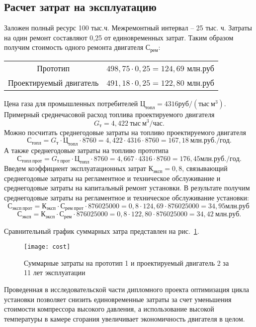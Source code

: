 \subsection{Расчет затрат на эксплуатацию}
Заложен полный ресурс 100 тыс.ч. Межремонтный интервал – 25 тыс. ч. Затраты на один ремонт составляют 0,25 от единовременных затрат.
Таким образом получим стоимость одного ремонта двигателя $С_{рем}$:
\begin{longtable}{c c}
    Прототип & $498,75 \cdot 0,25=124,69$ млн.руб \\
    Проектируемый двигатель & $491,18 \cdot 0,25=122,80$ млн.руб \\
\end{longtable}
Цена газа для промышленных потребителей $Ц_{топл} = 4316 руб/(тыс \ м^3)$.
Примерный среднечасовой расход топлива проектируемого двигателя
$$
G_т = 4,422 \ тыс \ м^3 / час.
$$
Можно посчитать среднегодовые затраты на топливо проектируемого двигателя
$$
С_{топл}=G_т \cdot Ц_{топл} \cdot 8760 = 4,422 \cdot 4316 \cdot 8760 = 167,18 \ млн.руб./год.
$$
А также среднегодовые затраты на топливо прототипа
$$
С_{топл \ прот} = G_{т \ прот} \cdot Ц_{топл} \cdot 8760 = 4,667 \cdot 4316 \cdot 8760 = 176,45 млн.руб./год.
$$
Введем коэффициент эксплуатационных затрат $К_{эксп} = 0,8$, связывающий среднегодовые затраты на регламентное и
техническое обслуживание и среднегодовые затраты на капитальный ремонт установки. В результате получим среднегодовые
затраты на регламентное и техническое обслуживание установки:
$$
С_{эксп \ прот} = К_{эксп} \cdot С_{рем \ прот} \cdot 876025000 = 0,8 \cdot 124,69 \cdot 876025000 = 34,95 млн.руб \
$$
$$
С_{эксп} = К_{эксп} \cdot С_{рем} \cdot 876025000 = 0,8 \cdot 122,80 \cdot 876025000 = 34,42 \ млн.руб.
$$

Сравнительный график суммарных затра представлен на рис.~\ref{img:economics-cost}.

\begin{figure}[H]
    \centering
    \texttt{[image: cost]}
    \caption{Суммарные затраты на прототип 1 и проектируемый двигатель 2 за 11 лет эксплуатации}
    \label{img:economics-cost}
\end{figure}
Проведенная в исследовательской части дипломного проекта оптимизация цикла установки позволяет снизить единовременные
затраты за счет уменьшения стоимости компрессора высокого давления, а использование высокой температуры в камере сгорания
увеличивает экономичность двигателя в целом.